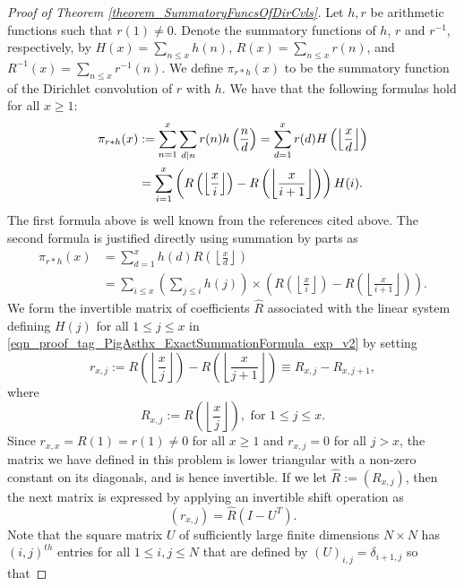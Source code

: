 \documentclass[11pt,reqno,a4letter]{article}
\numberwithin{figure}{section}
\numberwithin{table}{section}
\newcommand{\floor}[1]{\left\lfloor #1 \right\rfloor}
\newcommand{\Floor}[2]{\ensuremath{\left\lfloor \frac{#1}{#2} \right\rfloor}}
\theoremstyle{plain}
\numberwithin{theorem}{section}
\theoremstyle{definition}
\begin{document}
\begin{proof}[Proof of Theorem \ref{theorem_SummatoryFuncsOfDirCvls}] 
\label{proofOf_theorem_SummatoryFuncsOfDirCvls} 
Let $h,r$ be arithmetic functions such that $r(1) \neq 0$. 
Denote the summatory functions of $h$, $r$ and $r^{-1}$, 
respectively, by $H(x) = \sum_{n \leq x} h(n)$, $R(x) = \sum_{n \leq x} r(n)$, 
and $R^{-1}(x) = \sum_{n \leq x} r^{-1}(n)$. 
We define $\pi_{r \ast h}(x)$ to be the summatory function of the 
Dirichlet convolution of $r$ with $h$. 
We have that the following formulas hold for all $x \geq 1$: 
\begin{align} 
\notag 
\pi_{r \ast h}(x) & := \sum_{n=1}^{x} \sum_{d|n} r(n) h\left(\frac{n}{d}\right) = 
     \sum_{d=1}^x r(d) H\left(\floor{\frac{x}{d}}\right) \\ 
\label{eqn_proof_tag_PigAsthx_ExactSummationFormula_exp_v2} 
     & = \sum_{i=1}^x \left(R\left(\floor{\frac{x}{i}}\right) - R\left(\floor{\frac{x}{i+1}}\right)\right) H(i). 
\end{align} 
The first formula above is well known from the references cited above. 
The second formula is justified directly using 
summation by parts as \cite[\S 2.10(ii)]{NISTHB} 
\begin{align*} 
\pi_{r \ast h}(x) & = \sum_{d=1}^x h(d) R\left(\floor{\frac{x}{d}}\right) \\ 
     & = \sum_{i \leq x} \left(\sum_{j \leq i} h(j)\right) \times 
     \left(R\left(\floor{\frac{x}{i}}\right) - 
     R\left(\floor{\frac{x}{i+1}}\right)\right). 
\end{align*} 
We form the invertible matrix of coefficients $\hat{R}$ 
associated with the linear system defining $H(j)$ for all 
$1 \leq j \leq x$ in \eqref{eqn_proof_tag_PigAsthx_ExactSummationFormula_exp_v2} by setting 
\[
r_{x,j} := R\left(\floor{\frac{x}{j}}\right) - R\left(\floor{\frac{x}{j+1}}\right) 
     \equiv R_{x,j} - R_{x,j+1}, 
\] 
where 
\[
R_{x,j} := R\left(\Floor{x}{j}\right), \text{ for } 1 \leq j \leq x. 
\]
Since $r_{x,x} = R(1) = r(1) \neq 0$ for all $x \geq 1$ and $r_{x,j} = 0$ for all $j > x$, 
the matrix we have defined in this problem is lower triangular with a non-zero 
constant on its diagonals, and is hence invertible. 
If we let $\hat{R} := (R_{x,j})$, then the next matrix is 
expressed by applying an invertible shift operation as 
\[
(r_{x,j}) = \hat{R} \left(I - U^{T}\right). 
\]
Note that the square matrix $U$ of sufficiently large finite dimensions $N \times N$ 
has $(i,j)^{th}$ entries for all $1 \leq i,j \leq N$ that are defined by 
$(U)_{i,j} = \delta_{i+1,j}$ so that 

\end{proof}
\end{document}

